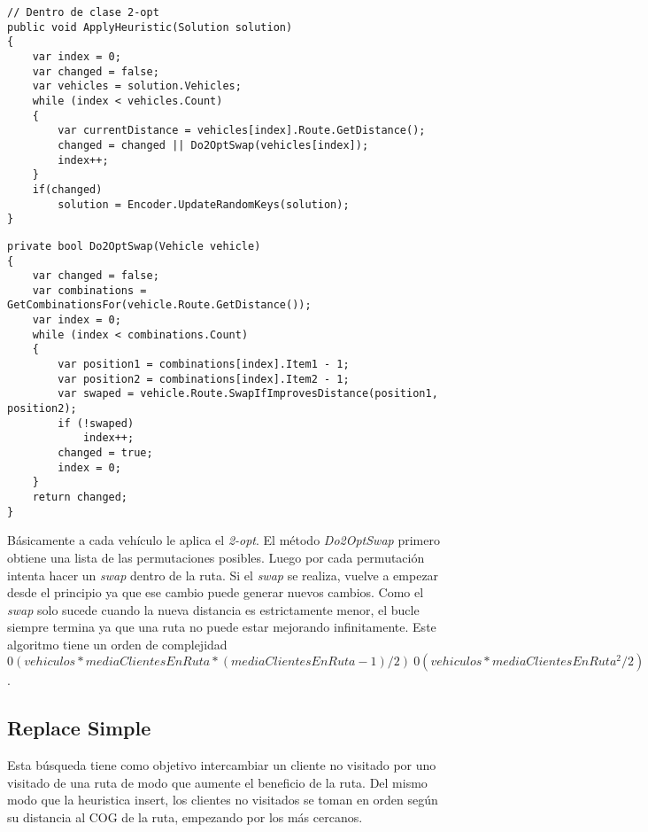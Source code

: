 \begin{minipage}{\textwidth}
\begin{lstlisting}
// Dentro de clase 2-opt
public void ApplyHeuristic(Solution solution)
{
	var index = 0;
	var changed = false;	
	var vehicles = solution.Vehicles;	
	while (index < vehicles.Count)
	{
		var currentDistance = vehicles[index].Route.GetDistance();
		changed = changed || Do2OptSwap(vehicles[index]);
		index++;
	}
	if(changed)
		solution = Encoder.UpdateRandomKeys(solution);
}
\end{lstlisting}
\end{minipage}

\begin{minipage}{\textwidth}
\begin{lstlisting}
private bool Do2OptSwap(Vehicle vehicle)
{
	var changed = false;	
	var combinations = GetCombinationsFor(vehicle.Route.GetDistance());
	var index = 0;
	while (index < combinations.Count)
	{
		var position1 = combinations[index].Item1 - 1;
		var position2 = combinations[index].Item2 - 1;
		var swaped = vehicle.Route.SwapIfImprovesDistance(position1, position2);
		if (!swaped)
			index++;
		changed = true;
		index = 0;
	}
	return changed;
}
\end{lstlisting}
\end{minipage}

\bigskip

Básicamente a cada vehículo le aplica el \textit{2-opt}. El método \textit{Do2OptSwap} primero obtiene una lista de las permutaciones posibles. Luego por cada permutación intenta hacer un \textit{swap} dentro de la ruta. Si el \textit{swap} se realiza, vuelve a empezar desde el principio ya que ese cambio puede generar nuevos cambios. Como el \textit{swap} solo sucede cuando la nueva distancia es estrictamente menor, el bucle siempre termina ya que una ruta no puede estar mejorando infinitamente. Este algoritmo tiene un orden de complejidad $0(vehiculos * mediaClientesEnRuta  * (mediaClientesEnRuta - 1) / 2) ~ 0 (vehiculos * mediaClientesEnRuta^2 / 2)$.

\subsection{Replace Simple}

Esta búsqueda tiene como objetivo intercambiar un cliente no visitado por uno visitado de una ruta de modo que aumente el beneficio de la ruta. Del mismo modo que la heuristica insert, los clientes no visitados se toman en orden según su distancia al COG de la ruta, empezando por los más cercanos.

